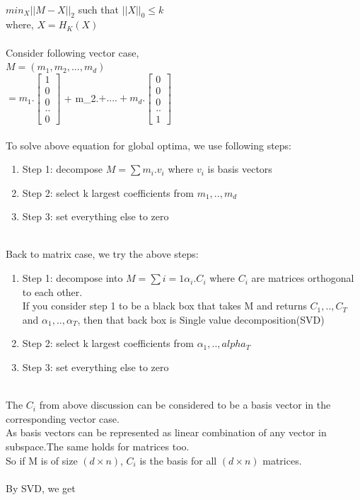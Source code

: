 \documentclass[12pt]{article}
\begin{document}
\\$min_X||M-X||_2$ such that $||X||_0 \leq k$
\\
where, $X = H_K(X)$\\
\\
Consider following vector case,\\
$M=(m_1,m_2,...,m_d)$
\\
$= m_1.\left[ {\begin{array}{c}
   1\\
   0\\
   0\\
   ..\\
   0
  \end{array} } \right]$ + 
  m_2.\left[ {\begin{array}{c}
   0\\
   1\\
   0\\
   ..\\
   0
  \end{array} } \right]$ + .... +
  m_d.\left[ {\begin{array}{c}
   0\\
   0\\
   0\\
   ..\\
   1
  \end{array} } \right]$\\
\\
To solve above equation for global optima, we use following steps:
\begin{enumerate}
    \item{Step 1}: decompose $M=\sum m_i.v_i$  where $v_i$ is basis vectors
    \item{Step 2}: select k largest coefficients from $m_1,..,m_d$
    \item{Step 3}: set everything else to zero 
\end{enumerate}
\\
Back to matrix case, we try the above steps:
\begin{enumerate}
    \item{Step 1}: decompose into $M=\sum{i=1}\alpha_i.C_i$  where $C_i$ are matrices orthogonal to each other.\\If you consider step 1 to be a black box that takes M and returns $C_1,..,C_T$ and $\alpha_1,..,\alpha_T$, then that back box is Single value decomposition(SVD)
    \item{Step 2}: select k largest coefficients from $\alpha_1,..,alpha_T$
    \item{Step 3}: set everything else to zero 
\end{enumerate}
\\ The $C_i$ from above discussion can be considered to be a basis vector in the corresponding vector case.
\\ As basis vectors can be represented as linear combination of any vector in subspace.The same holds for matrices too.
\\ So if M is of size $(d\times n)$, $C_i$ is the basis for all $(d\times n)$ matrices.\\
\\
By SVD, we get\\
\end{document}
